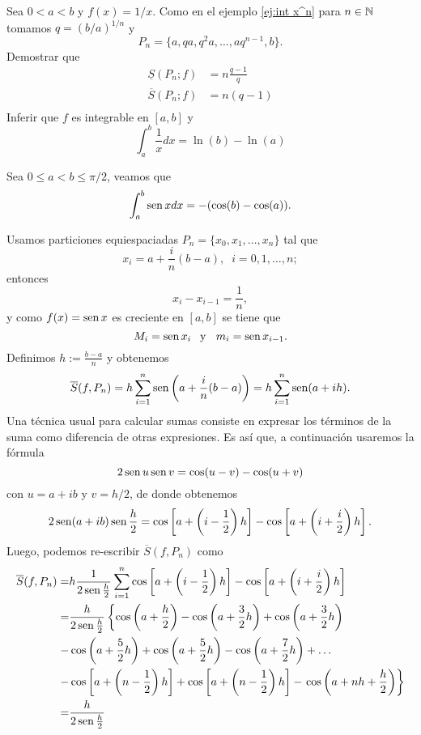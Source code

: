 \begin{ejercicio}{} Sea $0< a<b$  y $f(x)=1/x$. Como en el ejemplo \ref{ej:int x^n}  para $n\in\mathbb{N}$ tomamos $q=(b/a)^{1/n}$ y 
\[P_n=\{a,qa,q^2a,\ldots, aq^{n-1},b\}.\]  
Demostrar que
\[
\begin{split}
  \underline{S}(P_n;f)&= n\frac{q-1}{q}\\
  \overline{S}(P_n;f)&= n(q-1)\\
\end{split}
\]
Inferir que $f$ es integrable en $[a,b]$ y
\[
 \int_a^b \frac{1}{x} dx= \ln(b)-\ln(a)
\]
\end{ejercicio}


\begin{ejemplo}{} Sea $0\leq a<b\leq \pi/2$, veamos que
\[
 \int_a^b \operatorname{sen} x dx=-(\cos(b)-\cos(a)).
\]
\begin{demo}
Usamos particiones equiespaciadas  $P_n=\{x_0,x_1,\ldots, x_n\}$
tal que 
\[
x_i=a+\frac{i}{n}(b-a),\;\;i=0,1,\ldots,n;
\]
entonces
\[
x_i-x_{i-1}=\frac{1}{n},
\]
y como $f(x)=\operatorname{sen} x$ es creciente en $[a,b]$ se tiene que 
\[
M_i=\operatorname{sen} x_i\:\:\mbox{ y }\;\; m_i=\operatorname{sen} x_{i-1}.
\]
Definimos $h:=\frac{b-a}{n}$ y obtenemos 
\[
\overline{S}(f,P_n)=
h\sum\limits_{i=1}^n\operatorname{sen} \left( a+\frac{i}{n}(b-a)\right)
=h\sum\limits_{i=1}^n \operatorname{sen}(a+ih).
\]
Una t\'ecnica usual para calcular sumas consiste en expresar los t\'erminos de la suma como diferencia de otras expresiones. Es as\'i que, a continuaci\'on usaremos la f\'ormula
\[
2\operatorname{sen} u \operatorname{sen} v =\cos(u-v)-\cos (u+v)
\]
con $u=a+ib$ y $v=h/2$, de donde obtenemos
\[
2 \operatorname{sen}(a+ib) \operatorname{sen} \frac{h}{2}=
\cos\left[a+\left(i-\frac{1}{2}\right)h\right] - 
\cos \left[a+\left(i+\frac{i}{2}\right)h\right].
\]
Luego, podemos re-escribir $\overline{S}(f,P_n)$ como
\[
\begin{split}
\overline{S}(f,P_n)=
&h \frac{1}{2 \sen\frac{h}{2} }
\sum\limits_{i=1}^n 
\cos\left[a+\left(i-\frac{1}{2}\right) h\right] - 
\cos \left[a+\left(i+\frac{i}{2}\right) h\right]
\\
=&
\frac{h}{2 \sen\frac{h}{2}}
\left\{
\cos\left(a+\frac{h}{2}\right)-\cos\left(a+\frac{3}{2}h\right)+
\cos\left( a+\frac{3}{2}h\right)
\right.
\\
-&\cos\left(a+\frac{5}{2}h\right)+
\cos\left(a+\frac{5}{2}h\right)-
\cos\left( a+\frac{7}{2}h \right)
+\ldots 
\\
-&\cos\left[a+\left(n-\frac{1}{2}\right)h \right]
+\cos\left[a+\left(n-\frac{1}{2}\right)h \right]-
\left.\cos\left(a+nh+\frac{h}{2}\right)\right\}
\\ 
=&
\frac{h}{2 \sen\frac{h}{2}}

\end{split}\]
\end{demo}
\end{ejemplo}

